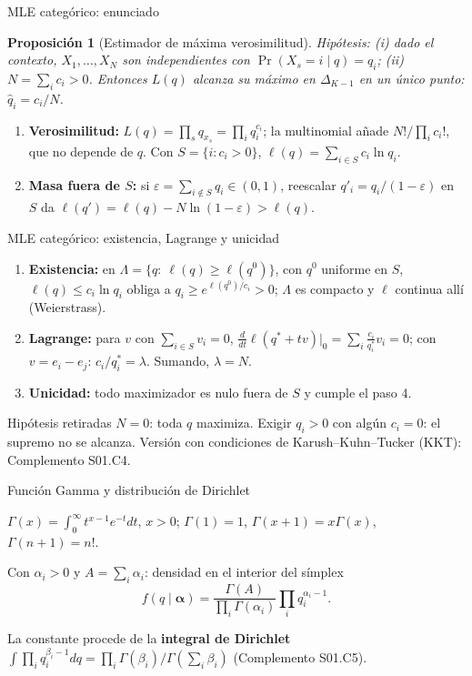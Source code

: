 \documentclass[aspectratio=169,10pt]{beamer}
\newtheorem{proposicion}{Proposición}
\begin{document}
\begin{frame}{MLE categórico: enunciado}
\begin{proposicion}[Estimador de máxima verosimilitud]
\emph{Hipótesis:} (i) dado el contexto, $X_1,\dots,X_N$ son independientes con
$\Pr(X_s=i\mid q)=q_i$; (ii) $N=\sum_ic_i>0$. Entonces $L(q)$ alcanza su máximo
en $\Delta_{K-1}$ en un único punto: $\widehat q_i=c_i/N$.
\end{proposicion}
\begin{enumerate}\small
\item \textbf{Verosimilitud:} $L(q)=\prod_sq_{x_s}=\prod_iq_i^{c_i}$; la multinomial añade
$N!/\prod_ic_i!$, que no depende de $q$. Con $S=\{i:c_i>0\}$, $\ell(q)=\sum_{i\in S}c_i\ln q_i$.
\item \textbf{Masa fuera de $S$:} si $\varepsilon=\sum_{i\notin S}q_i\in(0,1)$, reescalar
$q'_i=q_i/(1-\varepsilon)$ en $S$ da $\ell(q')=\ell(q)-N\ln(1-\varepsilon)>\ell(q)$.
\end{enumerate}
\end{frame}

\begin{frame}{MLE categórico: existencia, Lagrange y unicidad}
\begin{enumerate}\small\setcounter{enumi}{2}
\item \textbf{Existencia:} en $\Lambda=\{q:\ \ell(q)\ge\ell(q^0)\}$, con $q^0$ uniforme en $S$,
$\ell(q)\le c_i\ln q_i$ obliga a $q_i\ge e^{\ell(q^0)/c_i}>0$; $\Lambda$ es compacto y $\ell$
continua allí (Weierstrass).
\item \textbf{Lagrange:} para $v$ con $\sum_{i\in S}v_i=0$, $\frac{d}{dt}\ell(q^*+tv)|_{0}=\sum_i\frac{c_i}{q^*_i}v_i=0$;
con $v=e_i-e_j$: $c_i/q^*_i=\lambda$. Sumando, $\lambda=N$.
\item \textbf{Unicidad:} todo maximizador es nulo fuera de $S$ y cumple el paso 4.
\end{enumerate}
\begin{alertblock}{Hipótesis retiradas}
$N=0$: toda $q$ maximiza. Exigir $q_i>0$ con algún $c_i=0$: el supremo no se alcanza.
Versión con condiciones de Karush--Kuhn--Tucker (KKT): Complemento S01.C4.
\end{alertblock}
\end{frame}

\begin{frame}{Función Gamma y distribución de Dirichlet}
\begin{definition}
$\Gamma(x)=\int_0^\infty t^{x-1}e^{-t}dt$, $x>0$; $\Gamma(1)=1$, $\Gamma(x+1)=x\Gamma(x)$, $\Gamma(n+1)=n!$.
\end{definition}
\begin{definition}
Con $\alpha_i>0$ y $A=\sum_i\alpha_i$: densidad en el interior del símplex
\[f(q\mid\boldsymbol\alpha)=\frac{\Gamma(A)}{\prod_i\Gamma(\alpha_i)}\prod_iq_i^{\alpha_i-1}.\]
\end{definition}
\small La constante procede de la \textbf{integral de Dirichlet}
$\int\prod_iq_i^{\beta_i-1}dq=\prod_i\Gamma(\beta_i)/\Gamma(\sum_i\beta_i)$ (Complemento S01.C5).
\end{frame}
\end{document}
